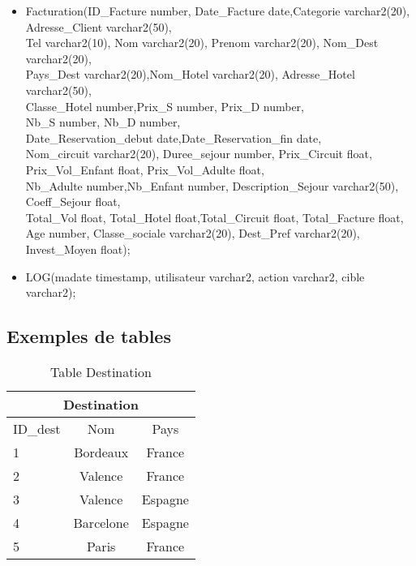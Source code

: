 \begin{itemize}
\item Facturation(ID\_Facture number, Date\_Facture date,Categorie varchar2(20), Adresse\_Client varchar2(50),\\
	 Tel varchar2(10), Nom varchar2(20), Prenom varchar2(20), Nom\_Dest varchar2(20), \\
	 Pays\_Dest varchar2(20),Nom\_Hotel varchar2(20), Adresse\_Hotel varchar2(50),\\
	 Classe\_Hotel number,Prix\_S number, Prix\_D number,\\
	 Nb\_S number, Nb\_D number,\\ 
	 Date\_Reservation\_debut date,Date\_Reservation\_fin date, \\
	 Nom\_circuit varchar2(20), Duree\_sejour number, Prix\_Circuit float, \\
	 Prix\_Vol\_Enfant float, Prix\_Vol\_Adulte float,\\
	 Nb\_Adulte number,Nb\_Enfant number, Description\_Sejour varchar2(50), Coeff\_Sejour float, \\
	 Total\_Vol float, Total\_Hotel float,Total\_Circuit float, Total\_Facture float, \\
	 Age number, Classe\_sociale varchar2(20), Dest\_Pref varchar2(20), Invest\_Moyen float);\\
	 
\item LOG(madate timestamp, utilisateur varchar2, action varchar2, cible varchar2);\\
	 
\end{itemize}
\newpage

\subsection{Exemples de tables}


\begin{table}[h]
\begin{center}
\begin{tabular}{|l|c|c|}
\hline
\multicolumn{3}{|c|}{Destination}\\
\hline
ID\_dest& Nom & Pays \\
\hline
1 & Bordeaux& France\\
\hline
2 & Valence& France\\
\hline
3 & Valence& Espagne\\
\hline
4 & Barcelone& Espagne\\
\hline
5 & Paris& France\\
\hline
\end{tabular}
\end{center}
\caption{Table Destination}
\end{table}

